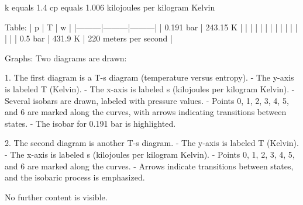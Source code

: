 k equals 1.4  
cp equals 1.006 kilojoules per kilogram Kelvin  

Table:  
| p       | T       | w       |  
|---------|---------|---------|  
| 0.191 bar | 243.15 K |         |  
|         |         |         |  
|         |         |         |  
|         |         |         |  
| 0.5 bar | 431.9 K | 220 meters per second |  

Graphs:  
Two diagrams are drawn:  

1. The first diagram is a T-s diagram (temperature versus entropy).  
   - The y-axis is labeled T (Kelvin).  
   - The x-axis is labeled s (kilojoules per kilogram Kelvin).  
   - Several isobars are drawn, labeled with pressure values.  
   - Points 0, 1, 2, 3, 4, 5, and 6 are marked along the curves, with arrows indicating transitions between states.  
   - The isobar for 0.191 bar is highlighted.  

2. The second diagram is another T-s diagram.  
   - The y-axis is labeled T (Kelvin).  
   - The x-axis is labeled s (kilojoules per kilogram Kelvin).  
   - Points 0, 1, 2, 3, 4, 5, and 6 are marked along the curves.  
   - Arrows indicate transitions between states, and the isobaric process is emphasized.  

No further content is visible.